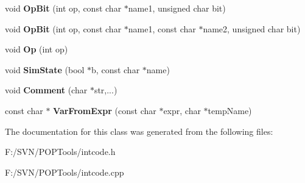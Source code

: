 \begin{DoxyCompactItemize}
\item 
\hypertarget{class_int_code_ac04981db37dbfd163da285fbf9825f12}{void {\bfseries Op\-Bit} (int op, const char $\ast$name1, unsigned char bit)}\label{class_int_code_ac04981db37dbfd163da285fbf9825f12}

\item 
\hypertarget{class_int_code_aa85f465bf00e616b9e172eb9c64f4bf9}{void {\bfseries Op\-Bit} (int op, const char $\ast$name1, const char $\ast$name2, unsigned char bit)}\label{class_int_code_aa85f465bf00e616b9e172eb9c64f4bf9}

\item 
\hypertarget{class_int_code_ab725d3b310356fc944e54e620336ba75}{void {\bfseries Op} (int op)}\label{class_int_code_ab725d3b310356fc944e54e620336ba75}

\item 
\hypertarget{class_int_code_a717f5c98854f62bf945ab2baf80e7879}{void {\bfseries Sim\-State} (bool $\ast$b, const char $\ast$name)}\label{class_int_code_a717f5c98854f62bf945ab2baf80e7879}

\item 
\hypertarget{class_int_code_a1fe647104b3883d14d4f895f2313e914}{void {\bfseries Comment} (char $\ast$str,...)}\label{class_int_code_a1fe647104b3883d14d4f895f2313e914}

\item 
\hypertarget{class_int_code_a6dabd538b6b946015b048268ee857ff0}{const char $\ast$ {\bfseries Var\-From\-Expr} (const char $\ast$expr, char $\ast$temp\-Name)}\label{class_int_code_a6dabd538b6b946015b048268ee857ff0}

\end{DoxyCompactItemize}


The documentation for this class was generated from the following files\-:\begin{DoxyCompactItemize}
\item 
F\-:/\-S\-V\-N/\-P\-O\-P\-Tools/intcode.\-h\item 
F\-:/\-S\-V\-N/\-P\-O\-P\-Tools/intcode.\-cpp\end{DoxyCompactItemize}

